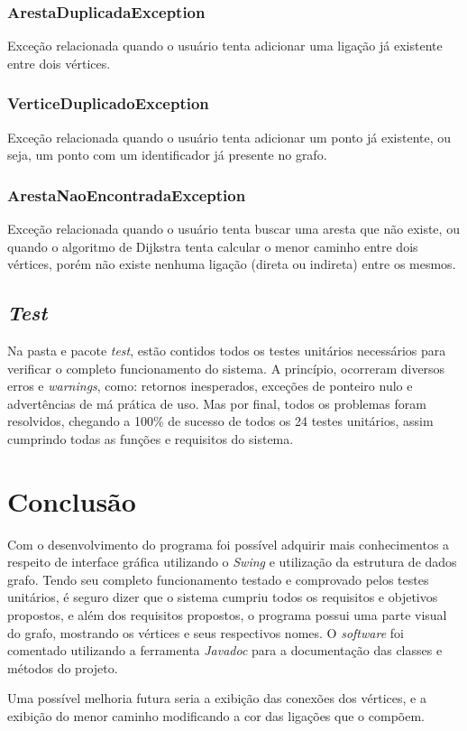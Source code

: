 \documentclass[12pt]{article}
\begin{document}
\subsubsection{ArestaDuplicadaException}
Exceção relacionada quando o usuário tenta adicionar uma ligação já existente entre dois vértices.

\subsubsection{VerticeDuplicadoException}
Exceção relacionada quando o usuário tenta adicionar um ponto já existente, ou seja, um ponto com um identificador já presente no grafo.

\subsubsection{ArestaNaoEncontradaException}
Exceção relacionada quando o usuário tenta buscar uma aresta que não existe, ou quando o algoritmo de Dijkstra tenta calcular o menor caminho entre dois vértices, porém não existe nenhuma ligação (direta ou indireta) entre os mesmos.

\subsection{{\itshape Test}}
Na pasta e pacote {\itshape test}, estão contidos todos os testes unitários necessários para verificar o completo funcionamento do sistema. A princípio, ocorreram diversos erros e {\itshape warnings}, como: retornos inesperados, exceções de ponteiro nulo e advertências de má prática de uso. Mas por final, todos os problemas foram resolvidos, chegando a 100\% de sucesso de todos os 24 testes unitários, assim cumprindo todas as funções e requisitos do sistema.

\section{Conclusão}
Com o desenvolvimento do programa foi possível adquirir mais conhecimentos a respeito de interface gráfica utilizando o {\itshape Swing} e utilização da estrutura de dados grafo. Tendo seu completo funcionamento testado e comprovado pelos testes unitários, é seguro dizer que o sistema cumpriu todos os requisitos e objetivos propostos, e além dos requisitos propostos, o programa possui uma parte visual do grafo, mostrando os vértices e seus respectivos nomes. O {\itshape software} foi comentado utilizando a ferramenta {\itshape Javadoc} para a documentação das classes e métodos do projeto.

Uma possível melhoria futura seria a exibição das conexões dos vértices, e a exibição do menor caminho modificando a cor das ligações que o compõem.



\end{document}
